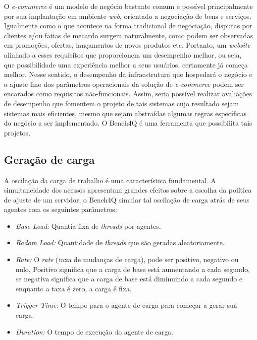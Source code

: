 O \textit{ e-commerce} é um modelo de negócio bastante comum e possível principalmente por sua implantação em ambiente \textit{ web}, orientado a negociação de bens e serviços. Igualmente como o que acontece na forma tradicional de negociação, disputas por clientes e/ou fatias de mecardo surgem naturalmente, como podem ser observadas em promoções, ofertas, lançamentos de novos produtos etc. Portanto, um \textit{ website} alinhado a esses requisitos que proporcionem um desempenho melhor, ou seja, que possibilidade uma experiência melhor a seus usuários, certamente já começa melhor. Nesse sentido, o desempenho da infraestrutura que hospedará o negócio e o ajuste fino dos parâmetros operacionais da solução de \textit{ e-commerce} podem ser encarados como requisitos não-funcionais. Assim, seria possível realizar avaliações de desempenho que fomentem o projeto de tais sistemas cujo resultado sejam sistemas mais eficientes, mesmo que sejam abstraídas algumas regras específicas do negócio a ser implementado. O Bench4Q é uma ferramenta que possibilita tais projetos.

\subsection{Geração de carga}

A oscilação da carga de trabalho é uma característica fundamental. A simultaneidade dos acessos apresentam grandes efeitos sobre a escolha da política de ajuste de um servidor, o Bench4Q simular tal oscilação de carga atrás de seus agentes com os seguintes parâmetros:

\begin{itemize}
	\item \textit{Base Load:} Quantia fixa de \textit{threads} por agentes.
	\item \textit{Radom Load:} Quantidade de \textit{threads} que são geradas aleatoriamente.
	\item \textit{Rate:} O \textit{rate} (taxa de mudanças de carga), pode ser positivo, negativo ou nulo. Positivo significa que a carga de base está aumentando a cada segundo, se negativa significa que a carga de base está diminuindo a cada segundo e enquanto a taxa é zero, a carga é fixa.
	\item \textit{Trigger Time:} O tempo para o agente de carga para começar a gerar sua carga.
	\item \textit{Duration:} O tempo de execução do agente de carga.
\end{itemize}

